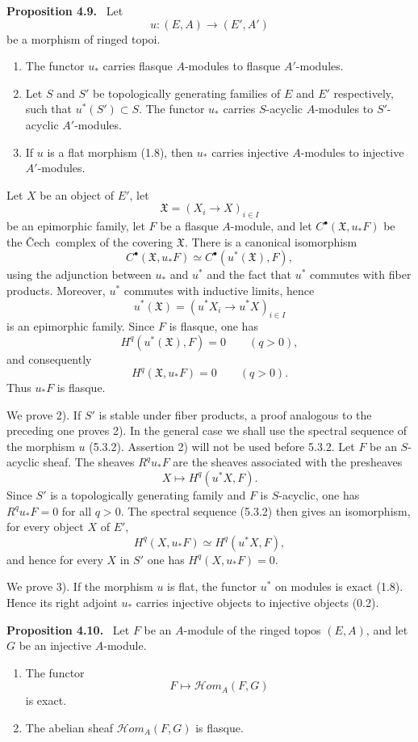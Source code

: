 \documentclass[11pt]{article}
\newcommand{\Cech}{\v{C}ech}
\newcommand{\Hhom}{\mathcal{H}om}
\newenvironment{statement}[1]{\par\medskip\noindent\textbf{#1.}\ }{\par\medskip}
\begin{document}
\begin{statement}{Proposition 4.9}
Let
\[
u:(E,A)\longrightarrow(E',A')
\]
be a morphism of ringed topoi.
\begin{enumerate}[label=\arabic*)]
\item The functor $u_*$ carries flasque $A$-modules to flasque $A'$-modules.
\item Let $S$ and $S'$ be topologically generating families of $E$ and $E'$ respectively, such that $u^*(S')\subset S$. The functor $u_*$ carries $S$-acyclic $A$-modules to $S'$-acyclic $A'$-modules.
\item If $u$ is a flat morphism (1.8), then $u_*$ carries injective $A$-modules to injective $A'$-modules.
\end{enumerate}
\end{statement}

Let $X$ be an object of $E'$, let
\[
\mathfrak X=(X_i\to X)_{i\in I}
\]
be an epimorphic family, let $F$ be a flasque $A$-module, and let $C^\bullet(\mathfrak X,u_*F)$ be the \Cech\ complex of the covering $\mathfrak X$. There is a canonical isomorphism
\[
C^\bullet(\mathfrak X,u_*F)\simeq C^\bullet(u^*(\mathfrak X),F),
\]
using the adjunction between $u_*$ and $u^*$ and the fact that $u^*$ commutes with fiber products. Moreover, $u^*$ commutes with inductive limits, hence
\[
u^*(\mathfrak X)=(u^*X_i\to u^*X)_{i\in I}
\]
is an epimorphic family. Since $F$ is flasque, one has
\[
H^q(u^*(\mathfrak X),F)=0\qquad(q>0),
\]
and consequently
\[
H^q(\mathfrak X,u_*F)=0\qquad(q>0).
\]
Thus $u_*F$ is flasque.

We prove 2). If $S'$ is stable under fiber products, a proof analogous to the preceding one proves 2). In the general case we shall use the spectral sequence of the morphism $u$ (5.3.2). Assertion 2) will not be used before 5.3.2. Let $F$ be an $S$-acyclic sheaf. The sheaves $R^q u_*F$ are the sheaves associated with the presheaves
\[
X\longmapsto H^q(u^*X,F).
\]
Since $S'$ is a topologically generating family and $F$ is $S$-acyclic, one has $R^q u_*F=0$ for all $q>0$. The spectral sequence (5.3.2) then gives an isomorphism, for every object $X$ of $E'$,
\[
H^q(X,u_*F)\simeq H^q(u^*X,F),
\]
and hence for every $X$ in $S'$ one has $H^q(X,u_*F)=0$.

We prove 3). If the morphism $u$ is flat, the functor $u^*$ on modules is exact (1.8). Hence its right adjoint $u_*$ carries injective objects to injective objects (0.2).

\begin{statement}{Proposition 4.10}
Let $F$ be an $A$-module of the ringed topos $(E,A)$, and let $G$ be an injective $A$-module.
\begin{enumerate}[label=\arabic*)]
\item The functor
\[
F\longmapsto \Hhom_A(F,G)
\]
is exact.
\item The abelian sheaf $\Hhom_A(F,G)$ is flasque.
\end{enumerate}
\end{statement}
\end{document}
